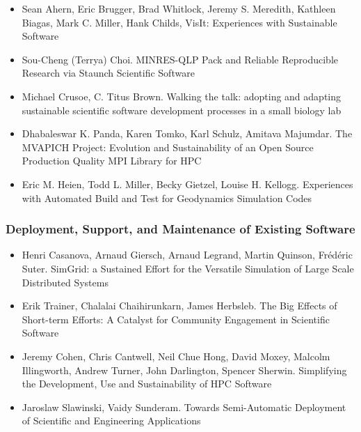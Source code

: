 \documentclass[11pt, oneside]{amsart}
\begin{document}
\begin{itemize}
\item Sean Ahern, Eric Brugger, Brad Whitlock, Jeremy S. Meredith, Kathleen Biagas, Mark C. Miller, Hank Childs, VisIt: Experiences with Sustainable Software \cite{Ahern_WSSSPE}

\item Sou-Cheng (Terrya) Choi. MINRES-QLP Pack and Reliable Reproducible Research via Staunch Scientific Software \cite{Choi_WSSSPE}

\item Michael Crusoe, C. Titus Brown. Walking the talk: adopting and adapting sustainable scientific software development processes in a small biology lab \cite{Crusoe_WSSSPE}

\item Dhabaleswar K. Panda, Karen Tomko, Karl Schulz, Amitava Majumdar. The MVAPICH Project: Evolution and Sustainability of an Open Source Production Quality MPI Library for HPC \cite{Panda_WSSSPE}

\item Eric M. Heien, Todd L. Miller, Becky Gietzel, Louise H. Kellogg. Experiences with Automated Build and Test for Geodynamics Simulation Codes \cite{Heien_WSSSPE}

\end{itemize}

\subsubsection*{Deployment, Support, and Maintenance of Existing Software}

\begin{itemize}

\item Henri Casanova, Arnaud Giersch, Arnaud Legrand, Martin Quinson, Fr\'{e}d\'{e}ric Suter. SimGrid: a Sustained Effort for the Versatile Simulation of Large Scale Distributed Systems~\cite{Casanova_WSSSPE}

\item Erik Trainer, Chalalai Chaihirunkarn, James Herbsleb. The Big Effects of Short-term Efforts: A Catalyst for Community Engagement in Scientific Software \cite{Trainer_WSSSPE}

\item Jeremy Cohen, Chris Cantwell, Neil Chue Hong, David Moxey, Malcolm Illingworth, Andrew Turner, John Darlington, Spencer Sherwin. Simplifying the Development, Use and Sustainability of HPC Software \cite{Cohen_WSSSPE}

\item Jaroslaw Slawinski, Vaidy Sunderam. Towards Semi-Automatic Deployment of Scientific and Engineering Applications \cite{Slawinski_WSSSPE}

\end{itemize}
\end{document}
